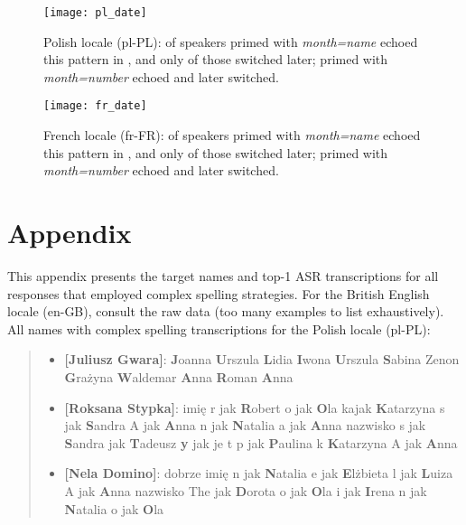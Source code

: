 \documentclass[11pt]{article}
\begin{document}
{\begin{figure}[h!]
\centering
\texttt{[image: pl\_date]}
\caption{Polish locale (pl-PL):
 of speakers primed with \textit{month=name}
echoed this pattern in ,
and only  of those switched later;
 primed with \textit{month=number} echoed and  later switched.}
\end{figure}



\begin{figure}[h!]
\centering
\texttt{[image: fr\_date]}
\caption{
French locale (fr-FR):
 of speakers primed with \textit{month=name}
echoed this pattern in ,
and only  of those switched later;
 primed with \textit{month=number} echoed and  later switched.}
\end{figure}





\section{Appendix}
\label{appendix-nato}

This appendix
presents the target names and top-1 ASR transcriptions
for all responses that employed complex spelling strategies.
For the British English locale (en-GB), consult the raw data (too many examples to list exhaustively).
All  names with complex spelling transcriptions for the Polish locale (pl-PL):
\begin{quote}
{\small
\begin{itemize}[align=left,leftmargin=5pt,rightmargin=-10pt]
\item \textbf{[Juliusz Gwara]}: \textbf{J}oanna \textbf{U}rszula \textbf{L}idia \textbf{I}wona \textbf{U}rszula \textbf{S}abina Zenon \textbf{G}rażyna \textbf{W}aldemar \textbf{A}nna \textbf{R}oman \textbf{A}nna

\item \textbf{[Roksana Stypka]}: imię r jak \textbf{R}obert o jak \textbf{O}la kajak \textbf{K}atarzyna s jak \textbf{S}andra A jak \textbf{A}nna n jak \textbf{N}atalia a jak \textbf{A}nna nazwisko s jak \textbf{S}andra jak \textbf{T}adeusz \textbf{y} jak je t p jak \textbf{P}aulina k \textbf{K}atarzyna A jak \textbf{A}nna

\item \textbf{[Nela Domino]}: dobrze imię n jak \textbf{N}atalia e jak \textbf{E}lżbieta l jak \textbf{L}uiza A jak \textbf{A}nna nazwisko The jak \textbf{D}orota o jak \textbf{O}la i jak \textbf{I}rena n jak \textbf{N}atalia o jak \textbf{O}la


\end{itemize}}
\end{quote}}
\end{document}
